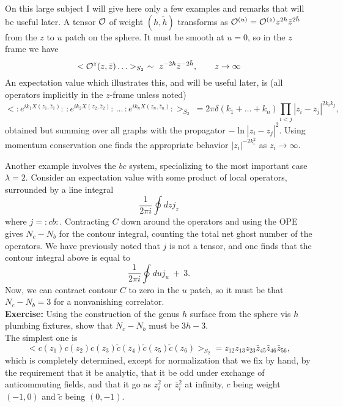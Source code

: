 
On this large subject I will give here only a few examples and
remarks that will be useful later.  A tensor ${\cal O}$ of weight
$(h,\tilde h)$ transforms as ${\cal O}^{(u)} = {\cal O}^{(z)} z^{2h}
\bar z^{2\tilde h}$ from the $z$ to $u$ patch on the sphere.  It
must be smooth at
$u=0$, so in the $z$ frame we have
\begin{equation}
< {\cal O}^{z}(z,\bar z) \ldots >_{S_2}\ \sim\ z^{-2h} \bar
z^{-2\tilde h}, \qquad z \to \infty
\end{equation}
An expectation value which illustrates this, and will be useful
later, is (all operators implicitly in the $z$-frame unless noted)
\begin{equation}
<:\! e^{i k_1 X(z_1,\bar z_1)} \! :\,
:\! e^{i k_2 X(z_2,\bar z_2)} \! :\,\ldots\,
:\! e^{i k_n X(z_n,\bar z_n)} \! : >_{S_2}\ = 2\pi
\delta(k_1 + \ldots + k_n) \prod_{i < j} 
|z_i - z_j|^{2 k_i k_j},
\end{equation}
obtained but summing over all graphs with the propagator
$-\ln |z_i - z_j|^2$.  Using momentum conservation one finds the
appropriate behavior $|z_i|^{-2 k_i^2}$ as $z_i \to \infty$.

Another example involves the $bc$ system, specializing to
the most important case $\lambda = 2$.  Consider an expectation
value with some product of local operators, surrounded by a line
integral
\begin{equation}
\frac{1}{2\pi i} \oint dz j_z
\end{equation}
where $j = :\!cb\!:$.  Contracting $C$ down around the operators
and using the OPE gives $N_c - N_b$ for the contour integral,
counting the total net ghost number of the operators.  We have
previously noted that $j$ is not a tensor, and one finds that
the contour integral above is equal to 
\begin{equation}
\frac{1}{2\pi i} \oint du j_u \ +\ 3.  \label{nbnc}
\end{equation}
Now, we can contract contour $C$ to zero in the $u$ patch, so
it must be that $N_c - N_b = 3$ for a nonvanishing
correlator.\\[3pt]
{\bf Exercise:} Using the construction of the genus $h$ surface
from the sphere vis $h$ plumbing fixtures, show that
$N_c - N_b$ must be $3h - 3$.\\[3pt]
The simplest one is
\begin{equation}
<c(z_1) c(z_2) c(z_3) 
\tilde c(z_4) \tilde c(z_5) \tilde c(z_6) >_{S_2}
= z_{12}z_{13}z_{23} \bar z_{45} \bar z_{46} \bar z_{56},
\end{equation}
which is completely determined, except for normalization that we
fix by hand, by the requirement that it be analytic, that it be odd
under exchange of anticommuting fields, and that it go as $z_i^2$ or
$\bar z_i^2$ at infinity, $c$ being weight
$(-1,0)$ and $\tilde c$ being $(0,-1)$.

